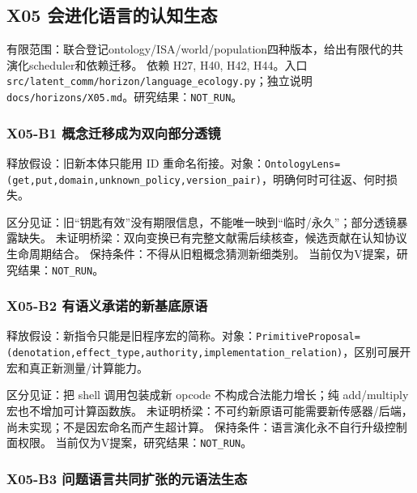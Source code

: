 \documentclass[
  10pt,
]{article}
\begin{document}
\subsection{X05
会进化语言的认知生态}\label{x05-ux4f1aux8fdbux5316ux8bedux8a00ux7684ux8ba4ux77e5ux751fux6001}

有限范围：联合登记ontology/ISA/world/population四种版本，给出有限代的共演化scheduler和依赖迁移。
依赖 H27, H40, H42, H44。入口
{\small\nolinkurl{src/latent_comm/horizon/language_ecology.py}}；独立说明
{\small\nolinkurl{docs/horizons/X05.md}}。研究结果：\nolinkurl{NOT_RUN}。

\subsubsection{X05-B1
概念迁移成为双向部分透镜}\label{x05-b1-ux6982ux5ff5ux8fc1ux79fbux6210ux4e3aux53ccux5411ux90e8ux5206ux900fux955c}

释放假设：旧新本体只能用 ID
重命名衔接。对象：\nolinkurl{OntologyLens=(get,put,domain,unknown_policy,version_pair)}，明确何时可往返、何时损失。

区分见证：旧``钥匙有效''没有期限信息，不能唯一映到``临时/永久''；部分透镜暴露缺失。
未证明桥梁：双向变换已有完整文献需后续核查，候选贡献在认知协议生命周期结合。
保持条件：不得从旧粗概念猜测新细类别。
当前仅为V提案，研究结果：\nolinkurl{NOT_RUN}。

\subsubsection{X05-B2
有语义承诺的新基底原语}\label{x05-b2-ux6709ux8bedux4e49ux627fux8bfaux7684ux65b0ux57faux5e95ux539fux8bed}

释放假设：新指令只能是旧程序宏的简称。对象：\nolinkurl{PrimitiveProposal=(denotation,effect_type,authority,implementation_relation)}，区别可展开宏和真正新测量/计算能力。

区分见证：把 shell 调用包装成新 opcode 不构成合法能力增长；纯
add/multiply 宏也不增加可计算函数族。
未证明桥梁：不可约新原语可能需要新传感器/后端，尚未实现；不是因宏命名而产生超计算。
保持条件：语言演化永不自行升级控制面权限。
当前仅为V提案，研究结果：\nolinkurl{NOT_RUN}。

\subsubsection{X05-B3
问题语言共同扩张的元语法生态}\label{x05-b3-ux95eeux9898ux8bedux8a00ux5171ux540cux6269ux5f20ux7684ux5143ux8bedux6cd5ux751fux6001}
\end{document}

